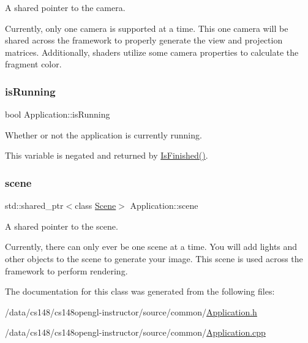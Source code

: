 A shared pointer to the camera. 

Currently, only one camera is supported at a time. This one camera will be shared across the framework to properly generate the view and projection matrices. Additionally, shaders utilize some camera properties to calculate the fragment color. \hypertarget{class_application_ae1c1ff7a7663d9baa9b65a7ba8e1dcf8}{}\label{class_application_ae1c1ff7a7663d9baa9b65a7ba8e1dcf8} 
\subsubsection{\texorpdfstring{is\+Running}{isRunning}}
{\footnotesize\ttfamily bool Application\+::is\+Running\hspace{0.3cm}{\ttfamily [protected]}}



Whether or not the application is currently running. 

This variable is negated and returned by \hyperlink{class_application_a454a1d926759c4bfac47e730570a7743}{Is\+Finished()}. \hypertarget{class_application_a88c6615107a5094bb93fa5f153f79554}{}\label{class_application_a88c6615107a5094bb93fa5f153f79554} 
\subsubsection{\texorpdfstring{scene}{scene}}
{\footnotesize\ttfamily std\+::shared\+\_\+ptr$<$class \hyperlink{class_scene}{Scene}$>$ Application\+::scene\hspace{0.3cm}{\ttfamily [protected]}}



A shared pointer to the scene. 

Currently, there can only ever be one scene at a time. You will add lights and other objects to the scene to generate your image. This scene is used across the framework to perform rendering. 

The documentation for this class was generated from the following files\+:\begin{DoxyCompactItemize}
\item 
/data/cs148/cs148opengl-\/instructor/source/common/\hyperlink{_application_8h}{Application.\+h}\item 
/data/cs148/cs148opengl-\/instructor/source/common/\hyperlink{_application_8cpp}{Application.\+cpp}\end{DoxyCompactItemize}
